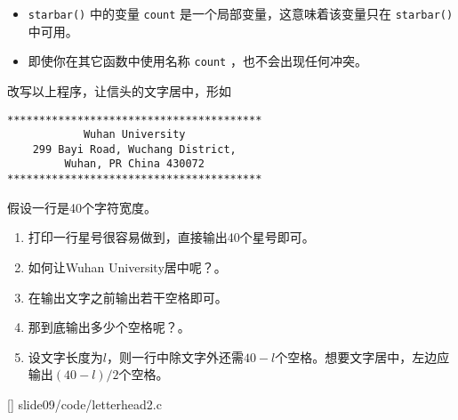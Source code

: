 \begin{frame}[fragile]
\begin{itemize}
\item \lstinline|starbar()| 中的变量 \lstinline|count| 是一个局部变量，这意味着该变量只在 \lstinline|starbar()| 中可用。\\[0.1in]
\item 
即使你在其它函数中使用名称 \lstinline|count| ，也不会出现任何冲突。
\end{itemize}

\end{frame}

\begin{frame}[fragile]
改写以上程序，让信头的文字居中，形如
\begin{lstlisting}
****************************************
            Wuhan University
    299 Bayi Road, Wuchang District,
         Wuhan, PR China 430072
****************************************
\end{lstlisting}
\end{frame}

\begin{frame}[fragile]
假设一行是40个字符宽度。\vspace{0.1in} \pause 

\begin{enumerate}
\item
打印一行星号很容易做到，直接输出40个星号即可。\\[0.1in] \pause 
\item 
如何让Wuhan University居中呢？。
\\[0.1in] \pause 
\item[]
在输出文字之前输出若干空格即可。\\[0.1in] \pause 
\item 
那到底输出多少个空格呢？。
\\[0.1in] \pause 
\item[]
设文字长度为$l$，则一行中除文字外还需$40-l$个空格。想要文字居中，左边应输出$(40-l)/2$个空格。
\end{enumerate}

\end{frame}

\begin{frame}

[]
{slide09/code/letterhead2.c}
\end{frame}


